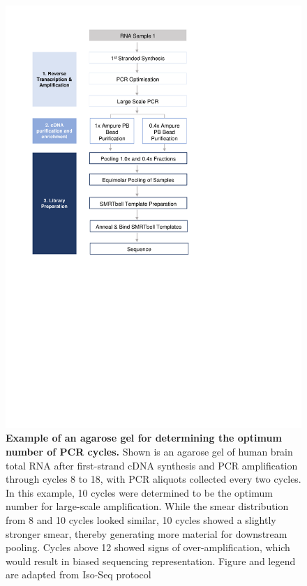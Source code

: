 \begin{figure}[htp]
	\begin{center}
		\includegraphics[page=13,trim={1cm 24cm 10cm 1cm},clip,scale = 0.9]{Figures/ProjectDevelopment_Figures.pdf}
	\end{center}
	\captionsetup{width=0.95\textwidth}
	\caption[Example of an agarose gel for determining the optimum number of PCR cycles]%
	{\textbf{Example of an agarose gel for determining the optimum number of PCR cycles.} Shown is an agarose gel of human brain total RNA after first-strand cDNA synthesis and PCR amplification through cycles 8 to 18, with PCR aliquots collected every two cycles. In this example, 10 cycles were determined to be the optimum number for large-scale amplification. While the smear distribution from 8 and 10 cycles looked similar, 10 cycles showed a slightly stronger smear, thereby generating more material for downstream pooling. Cycles above 12 showed signs of over-amplification, which would result in biased sequencing representation. Figure and legend are adapted from Iso-Seq protocol}
	\label{fig:pcr_optimisation_gel_eg}
\end{figure}


